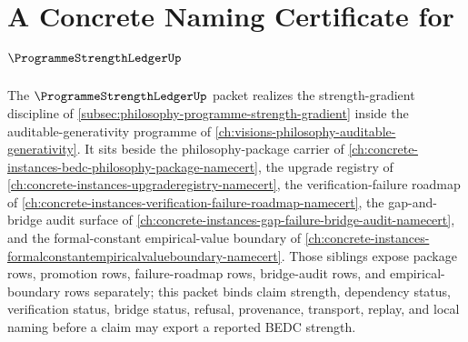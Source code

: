 \chapter{A Concrete Naming Certificate for $\ProgrammeStrengthLedgerUp$}
\label{ch:concrete-instances-programme-strength-ledger-namecert}

The $\ProgrammeStrengthLedgerUp$ packet realizes the strength-gradient discipline of \autoref{subsec:philosophy-programme-strength-gradient} inside the auditable-generativity programme of \autoref{ch:visions-philosophy-auditable-generativity}. It sits beside the philosophy-package carrier of \autoref{ch:concrete-instances-bedc-philosophy-package-namecert}, the upgrade registry of \autoref{ch:concrete-instances-upgraderegistry-namecert}, the verification-failure roadmap of \autoref{ch:concrete-instances-verification-failure-roadmap-namecert}, the gap-and-bridge audit surface of \autoref{ch:concrete-instances-gap-failure-bridge-audit-namecert}, and the formal-constant empirical-value boundary of \autoref{ch:concrete-instances-formalconstantempiricalvalueboundary-namecert}. Those siblings expose package rows, promotion rows, failure-roadmap rows, bridge-audit rows, and empirical-boundary rows separately; this packet binds claim strength, dependency status, verification status, bridge status, refusal, provenance, transport, replay, and local naming before a claim may export a reported BEDC strength.

